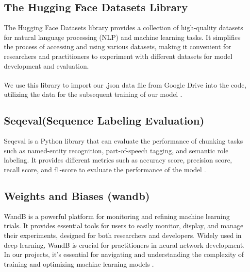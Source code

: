 \subsection{The Hugging Face Datasets Library}
The Hugging Face Datasets library provides a collection of high-quality datasets for natural language processing (NLP) and machine learning tasks. It simplifies the process of accessing and using various datasets, making it convenient for researchers and practitioners to experiment with different datasets for model development and evaluation.\\
\\
We use this library to import our .json data file from Google Drive into the code, utilizing the data for the subsequent training of our model \cite{HuggingFace}.

\subsection{Seqeval(Sequence Labeling Evaluation)} 

Seqeval is a Python library that can evaluate the performance of chunking tasks such as named-entity recognition, part-of-speech tagging, and semantic role labeling. It provides different metrics such as accuracy score, precision score, recall score, and f1-score to evaluate the performance of the model \cite{seqeval}.

\subsection{Weights and Biases (wandb)}
WandB is a powerful platform for monitoring and refining machine learning trials. It provides essential tools for users to easily monitor, display, and manage their experiments, designed for both researchers and developers. Widely used in deep learning, WandB is crucial for practitioners in neural network development. In our projects, it's essential for navigating and understanding the complexity of training and optimizing machine learning models \cite{W.}.

